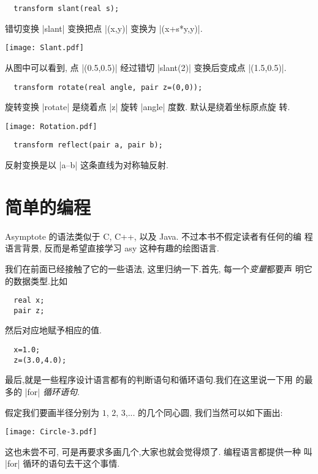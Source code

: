 \documentclass{ctexbook}
\begin{document}
\begin{lstlisting}
  transform slant(real s);
\end{lstlisting}

错切变换 |slant| 变换把点 |(x,y)| 变换为 |(x+s*y,y)|.
\begin{center}\texttt{[image: Slant.pdf]}\end{center}%

从图中可以看到, 点 |(0.5,0.5)| 经过错切 |slant(2)| 变换后变成点 
|(1.5,0.5)|. 

\begin{lstlisting}
  transform rotate(real angle, pair z=(0,0));
\end{lstlisting}
旋转变换 |rotate| 是绕着点 |z| 旋转 |angle| 度数. 默认是绕着坐标原点旋
转.
\begin{center}\texttt{[image: Rotation.pdf]}\end{center}%


\begin{lstlisting}
  transform reflect(pair a, pair b);
\end{lstlisting}
反射变换是以 |a--b| 这条直线为对称轴反射.


\section{简单的编程}
Asymptote 的语法类似于 C, C++, 以及 Java. 不过本书不假定读者有任何的编
程语言背景, 反而是希望直接学习 asy 这种有趣的绘图语言.

我们在前面已经接触了它的一些语法, 这里归纳一下.首先, 每一个\emph{变量}都要声
明它的数据类型.比如

\begin{lstlisting}
  real x;
  pair z;
\end{lstlisting}
然后对应地赋予相应的值.
\begin{lstlisting}
  x=1.0;
  z=(3.0,4.0);
\end{lstlisting}

最后,就是一些程序设计语言都有的判断语句和循环语句.我们在这里说一下用
的最多的 |for| \emph{循环语句}.

假定我们要画半径分别为 $1$, $2$, $3$,...
的几个同心圆, 我们当然可以如下画出:
\begin{center}\texttt{[image: Circle-3.pdf]}\end{center}%


这也未尝不可, 可是再要求多画几个,大家也就会觉得烦了. 编程语言都提供一种
叫 |for| 循环的语句去干这个事情.
\end{document}
